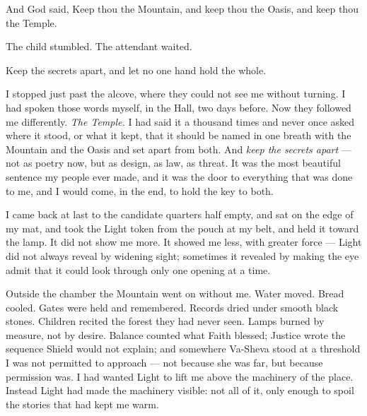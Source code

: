 \begin{scripture}
And God said, Keep thou the Mountain, and keep thou the Oasis, and keep thou the Temple.
\end{scripture}

The child stumbled. The attendant waited.\par

\begin{scripture}
Keep the secrets apart, and let no one hand hold the whole.
\end{scripture}

I stopped just past the alcove, where they could not see me without turning. I had spoken those words myself, in the Hall, two days before. Now they followed me differently. \textit{The Temple.} I had said it a thousand times and never once asked where it stood, or what it kept, that it should be named in one breath with the Mountain and the Oasis and set apart from both. And \textit{keep the secrets apart} --- not as poetry now, but as design, as law, as threat. It was the most beautiful sentence my people ever made, and it was the door to everything that was done to me, and I would come, in the end, to hold the key to both.\par

\ornament

\noindent I came back at last to the candidate quarters half empty, and sat on the edge of my mat, and took the Light token from the pouch at my belt, and held it toward the lamp. It did not show me more. It showed me less, with greater force --- Light did not always reveal by widening sight; sometimes it revealed by making the eye admit that it could look through only one opening at a time.\par

Outside the chamber the Mountain went on without me. Water moved. Bread cooled. Gates were held and remembered. Records dried under smooth black stones. Children recited the forest they had never seen. Lamps burned by measure, not by desire. Balance counted what Faith blessed; Justice wrote the sequence Shield would not explain; and somewhere Va-Sheva stood at a threshold I was not permitted to approach --- not because she was far, but because permission was. I had wanted Light to lift me above the machinery of the place. Instead Light had made the machinery visible: not all of it, only enough to spoil the stories that had kept me warm.\par


